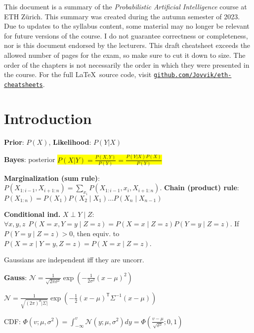 \documentclass[11pt,landscape,a4paper,fleqn]{article}
\newcommand*{\tran}{^{\mathsf{T}}} %
\newcommand{\mhl}[1]{\setlength{\fboxsep}{0pt}\colorbox{yellow}{#1}}
\begin{document}
	
\begin{multicols*}{4}

This document is a summary of the \textit{Probabilistic Artificial Intelligence} course at ETH Z\"urich.
This summary was created during the autumn semester of 2023.
Due to updates to the syllabus content, some material may no longer be relevant for future versions of the course.
I do not guarantee correctness or completeness, nor is this document endorsed by the lecturers.
This draft cheatsheet exceeds the allowed number of pages for the exam, so make sure to cut it down to size.
The order of the chapters is not necessarily the order in which they were presented in the course.
For the full \LaTeX \ source code, visit \texttt{\href{https://github.com/Jovvik/eth-cheatsheets}{github.com/Jovvik/eth-cheatsheets}}.

\newpage
    
\section{Introduction}

\textbf{Prior}: \(P(X)\), \textbf{Likelihood}: \(P(Y|X)\)

\textbf{Bayes}: posterior \mhl{$P(X|Y) = \frac{P(X,Y)}{P(Y)} = \frac{P(Y|X)P(X)}{P(Y)}$}

\textbf{Marginalization (sum rule)}: \(P(X_{1:i - 1}, X_{i + 1:n}) = \sum_{x_i} P(X_{1:i - 1}, x_i, X_{i + 1:n})\).
\textbf{Chain (product) rule}: \(P(X_{1:n}) = P(X_1) P(X_2 \mid X_1) \dots P(X_n \mid X_{n-1})\)

\textbf{Conditional ind.} \(X \perp Y \mid Z\): \(\forall x, y, z \ \ P(X = x, Y = y \mid Z = z) = P(X = x \mid Z = z) P(Y = y \mid Z = z)\).
If \(P(Y = y \mid Z = z) > 0\), then equiv. to \(P(X = x \mid Y = y, Z = z) = P(X = x \mid Z = z)\).

Gaussians are independent iff they are uncorr.

\textbf{Gauss}: \(\mathcal{N} = \frac{1}{\sqrt{2\pi\sigma^2}} \exp(-\frac{1}{2\sigma^2}(x - \mu)^2)\)

$\mathcal{N} = \frac{1}{\sqrt{(2\pi)^d |\Sigma|}}\exp(-\frac{1}{2}(x-\mu)\tran\Sigma^{-1} (x-\mu))$

CDF: \mbox{$\Phi(v;\mu,\sigma^2) = \int_{-\infty}^{v}\mathcal{N}(y;\mu,\sigma^2)dy=\Phi(\frac{v-\mu}{\sqrt{\sigma^2}};0,1)$}


\end{multicols*}
\end{document}
